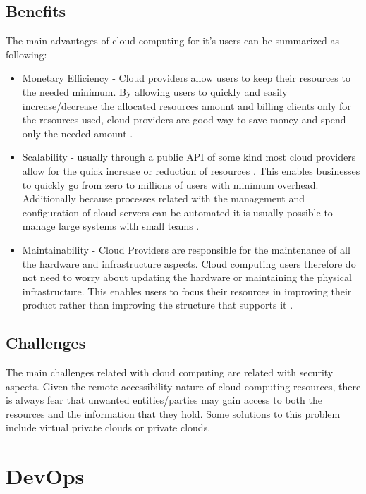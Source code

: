 		\subsection{Benefits}
			The main advantages of cloud computing for it's users can be summarized as following:
			\begin{itemize}

				\item{Monetary Efficiency} - Cloud providers allow users to keep their resources to the needed minimum. By allowing users to quickly and easily increase/decrease the allocated resources amount and billing clients only for the resources used, cloud providers are good way to save money and spend only the needed amount \cite{Garrison2012,Mell2011}.
		    
				\item{Scalability} - usually through a public API of some kind most cloud providers allow for the quick increase or reduction of resources \cite{Mell2011}. This enables businesses to quickly go from zero to millions of users with minimum overhead. Additionally because processes related with the management and configuration of cloud servers can be automated it is usually possible to manage large systems with small teams \cite{Loukides2012}. 
		    
		    	\item{Maintainability} - Cloud Providers are responsible for the maintenance of all the hardware and infrastructure aspects. Cloud computing users therefore do not need to worry about updating the hardware or maintaining the physical infrastructure. This enables users to focus their resources in improving their product rather than improving the structure that supports it \cite{Garrison2012}.
			\end{itemize}
            
		\subsection{Challenges}

		The main challenges related with cloud computing are related with security aspects. Given the remote accessibility nature of cloud computing resources, there is always fear that unwanted entities/parties may gain access to both the resources and the information that they hold. Some solutions to this problem include virtual private clouds or private clouds. 



	\section{DevOps}\label{sec:stateArtDevops}
		
